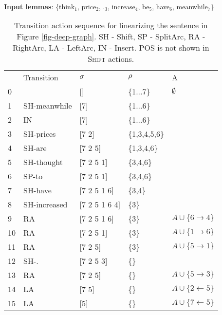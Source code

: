 \documentclass[11pt]{article}
\begin{document}
\begin{table}[t]
\centering
\scriptsize
\begin{tablenotes}
\item \textbf{Input lemmas}: \{think$_1$, price$_2$, .$_3$, increase$_4$,  be$_5$, have$_6$, meanwhile$_7$\} 
\end{tablenotes}
\vspace*{0.5em}
\begin{tabular}{lllll}
\hline
  & Transition     & $\sigma$    & $\rho$     & A \\
0 &                & []          & \{1...7\} & $\emptyset$                 \\ 
1 & {\sc SH}-meanwhile    & [7]         & \{1...6\} &                             \\ 2 & {\sc IN}    & [7]         & \{1...6\} &                             \\ 3 & {\sc SH}-prices    & [7 2]       & \{1,3,4,5,6\} &                             \\ 4 & {\sc SH}-are    & [7 2 5]     & \{1,3,4,6\} &                             \\ 5 & {\sc SH}-thought    & [7 2 5 1]   & \{3,4,6\}   &                             \\ 6 & {\sc SP}-to    & [7 2 5 1] & \{3,4,6\}     &                       \\ 7 & {\sc SH}-have    & [7 2 5 1 6]   & \{3,4\}   &                             \\ 8 & {\sc SH}-increased    & [7 2 5 1 6 4]   & \{3\}   &                             \\ 9 & {\sc RA} & [7 2 5 1 6]   & \{3\}     & $A \cup \{6\rightarrow 4\}$ \\ 10 & {\sc RA} & [7 2 5 1]     & \{3\}     & $A \cup \{1\rightarrow 6\}$ \\ 11 & {\sc RA} & [7 2 5]       & \{3\}     & $A \cup \{5\rightarrow 1\}$ \\ 12 & {\sc SH}-.    & [7 2 5 3]     & \{\}      &                             \\ 13& {\sc RA} & [7 2 5]       & \{\}      & $A \cup \{5\rightarrow 3\}$ \\ 14& {\sc LA}  & [7 5]         & \{\}      & $A \cup \{2\leftarrow 5\}$  \\ 15& {\sc LA}  & [5]         & \{\}      & $A \cup \{7\leftarrow 5\}$  \\ 

\hline
\end{tabular}
\caption{Transition action sequence for linearizing the sentence in Figure \ref{fig-deep-graph}. SH  - {\sc Shift}, SP - {\sc SplitArc}, RA - {\sc RightArc}, LA - {\sc LeftArc}, IN - {\sc Insert}. POS is not shown in \textsc{Shift} actions.}
\label{tbl:arc-standard-linearization}
\vspace*{-0.5em}
\end{table}	
  
\end{document}

